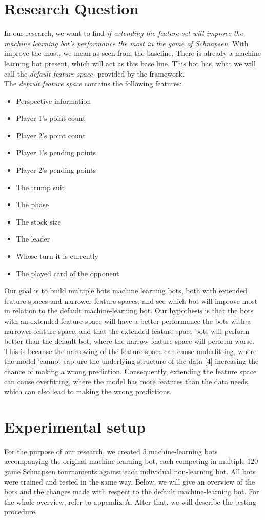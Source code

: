 \documentclass[a4paper,11pt]{article}
\begin{document}
\clearpage
\section{Research Question}
In our research, we want to find \textit{if extending the feature set will improve the machine learning bot's performance the most in the game of Schnapsen}. With improve the most, we mean as seen from the baseline. There is already a machine learning bot present, which will act as this base line. This bot has, what we will call the \textit{default feature space}- provided by the framework.  \\

\noindent
The \textit{default feature space} contains the following features:
\begin{itemize}
\item Perspective information
\item Player 1's point count
\item Player 2's point count
\item Player 1's pending points
\item Player 2's pending points
\item The trump suit
\item The phase
\item The stock size
\item The leader
\item Whose turn it is currently
\item The played card of the opponent
\end{itemize}



\noindent
Our goal is to build multiple bots machine learning bots, both with extended feature spaces and narrower feature spaces, and see which bot will improve most in relation to the default machine-learning bot. Our hypothesis is that the bots with an extended feature space will have a better performance the bots with a narrower feature space, and that the extended feature space bots will perform better than the default bot, where the narrow feature space will perform worse. This is because the narrowing of the feature space can cause underfitting, where the model 'cannot capture the underlying structure of the data [4] increasing the chance of making a wrong prediction. Consequently, extending the feature space can cause overfitting, where the model has more features than the data needs, which can also lead to making the wrong predictions.


\clearpage
\section{Experimental setup}
For the purpose of our research, we created 5 machine-learning bots accompanying the original machine-learning bot, each competing in multiple 120 game Schnapsen tournaments against each individual non-learning bot. All bots were trained and tested in the same way. Below, we will give an overview of the bots and the changes made with respect to the default machine-learning bot. For the whole overview, refer to appendix A. After that, we will describe the testing procedure.
\end{document}
